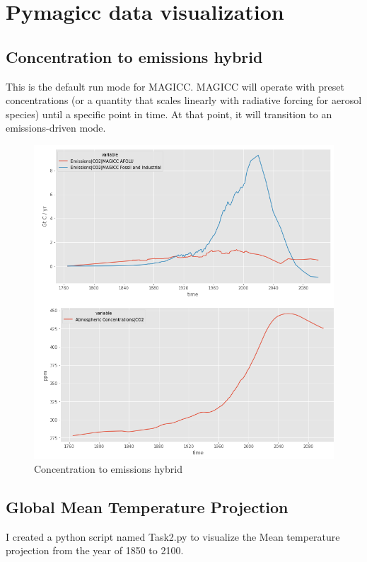 \documentclass[12pt, letterpaper]{article}
\begin{document}
\section{Pymagicc data visualization}

\subsection{Concentration to emissions hybrid}
This is the default run mode for MAGICC. MAGICC will operate with preset concentrations (or a quantity that scales linearly with radiative forcing for aerosol species) until a specific point in time. At that point, it will transition to an emissions-driven mode. 

\begin{figure}[H]
\centering
\includegraphics[scale=0.7]{Task1.PNG}
\caption{Concentration to emissions hybrid}
\label{fig:Task1}
\end{figure}

\subsection{Global Mean Temperature Projection}
I created a python script named Task2.py  to visualize the Mean temperature projection from the year of 1850 to 2100.
\end{document}
